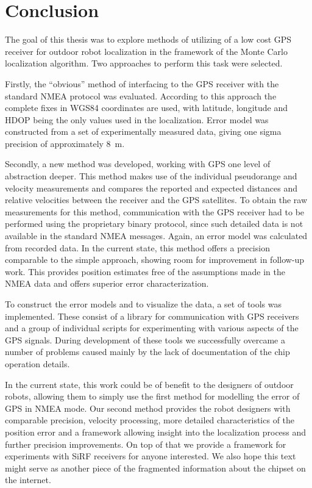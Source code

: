 \chapter{Conclusion}
\label{chap:conclusion}

The goal of this thesis was to explore methods of utilizing of a low cost GPS receiver
for outdoor robot localization in the framework of the Monte Carlo localization algorithm.
Two approaches to perform this task were selected.

Firstly, the \enquote{obvious} method of interfacing to the GPS receiver with the
standard NMEA protocol was evaluated.
According to this approach the complete fixes in WGS84 coordinates are used,
with latitude, longitude and HDOP being the only values used in the localization.
Error model was constructed from a set of experimentally measured data,
giving one sigma precision of approximately \SI{8}{\meter}.

Secondly, a new method was developed, working with GPS one level of abstraction deeper.
This method makes use of the individual pseudorange and velocity measurements
and compares the reported and expected distances and relative velocities between
the receiver and the GPS satellites.
To obtain the raw measurements for this method, communication with the GPS
receiver had to be performed using the proprietary binary protocol,
since such detailed data is not available in the standard NMEA messages.
Again, an error model was calculated from recorded data.
In the current state, this method offers a precision comparable to the simple
approach, showing room for improvement in follow-up work.
This provides position estimates free of the assumptions made in the NMEA data
and offers superior error characterization.

To construct the error models and to visualize the data, a set of tools was implemented.
These consist of a library for communication with \sirf GPS receivers
and a group of individual scripts for experimenting with various aspects of the GPS signals.
During development of these tools we successfully overcame a number of problems caused mainly
by the lack of documentation of the \sirf chip operation details.

In the current state, this work could be of benefit to the designers of
outdoor robots, allowing them to simply use the first method for modelling the
error of GPS in NMEA mode.
Our second method provides the robot designers with comparable precision,
velocity processing, more detailed characteristics of the position error
and a framework allowing insight into the localization process and further
precision improvements.
On top of that we provide a framework for experiments with SiRF receivers
for anyone interested.
We also hope this text might serve as another piece of the fragmented
information about the \sirf chipset on the internet.

